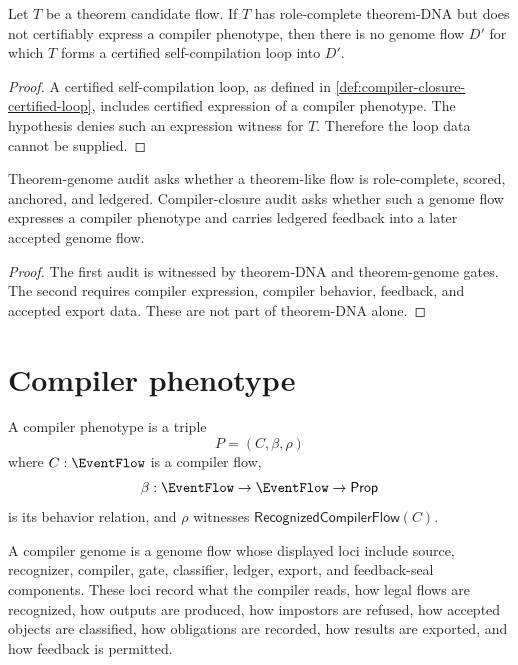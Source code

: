 \begin{theorem}
\label{thm:compiler-closure-dna-alone-not-self-compilation}
Let $T$ be a theorem candidate flow. If $T$ has role-complete theorem-DNA but
does not certifiably express a compiler phenotype, then there is no genome flow
$D'$ for which $T$ forms a certified self-compilation loop into $D'$.
\end{theorem}
\begin{proof}
A certified self-compilation loop, as defined in
\autoref{def:compiler-closure-certified-loop}, includes certified expression
of a compiler phenotype. The hypothesis denies such an expression witness for
$T$. Therefore the loop data cannot be supplied.
\end{proof}

\begin{corollary}
\label{cor:compiler-closure-two-audits}
Theorem-genome audit asks whether a theorem-like flow is role-complete, scored,
anchored, and ledgered. Compiler-closure audit asks whether such a genome flow
expresses a compiler phenotype and carries ledgered feedback into a later
accepted genome flow.
\end{corollary}
\begin{proof}
The first audit is witnessed by theorem-DNA and theorem-genome gates. The
second requires compiler expression, compiler behavior, feedback, and accepted
export data. These are not part of theorem-DNA alone.
\end{proof}

\section{Compiler phenotype}
\label{sec:compiler-closure-phenotype}

\begin{definition}
\label{def:compiler-closure-compiler-phenotype}
A compiler phenotype is a triple
$$
P=(C,\beta,\rho)
$$
where $C:\EventFlow$ is a compiler flow,
$$
\beta:\EventFlow\to\EventFlow\to\mathsf{Prop}
$$
is its behavior relation, and $\rho$ witnesses
$\mathsf{RecognizedCompilerFlow}(C)$.
\end{definition}

\begin{definition}
\label{def:compiler-closure-compiler-genome-loci}
A compiler genome is a genome flow whose displayed loci include source,
recognizer, compiler, gate, classifier, ledger, export, and feedback-seal
components. These loci record what the compiler reads, how legal flows are
recognized, how outputs are produced, how impostors are refused, how accepted
objects are classified, how obligations are recorded, how results are exported,
and how feedback is permitted.
\end{definition}

